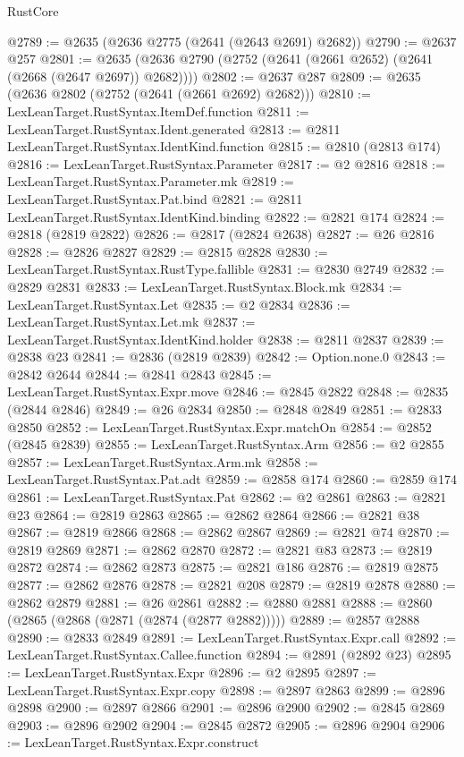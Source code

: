\begin{lexlean}{RustCore}
\begin{coremodule}
@2789 := @2635 (@2636 @2775 (@2641 (@2643 @2691) @2682))
@2790 := @2637 @257
@2801 := @2635 (@2636 @2790 (@2752 (@2641 (@2661 @2652) (@2641 (@2668 (@2647 @2697)) @2682))))
@2802 := @2637 @287
@2809 := @2635 (@2636 @2802 (@2752 (@2641 (@2661 @2692) @2682)))
@2810 := LexLeanTarget.RustSyntax.ItemDef.function
@2811 := LexLeanTarget.RustSyntax.Ident.generated
@2813 := @2811 LexLeanTarget.RustSyntax.IdentKind.function
@2815 := @2810 (@2813 @174)
@2816 := LexLeanTarget.RustSyntax.Parameter
@2817 := @2 @2816
@2818 := LexLeanTarget.RustSyntax.Parameter.mk
@2819 := LexLeanTarget.RustSyntax.Pat.bind
@2821 := @2811 LexLeanTarget.RustSyntax.IdentKind.binding
@2822 := @2821 @174
@2824 := @2818 (@2819 @2822)
@2826 := @2817 (@2824 @2638)
@2827 := @26 @2816
@2828 := @2826 @2827
@2829 := @2815 @2828
@2830 := LexLeanTarget.RustSyntax.RustType.fallible
@2831 := @2830 @2749
@2832 := @2829 @2831
@2833 := LexLeanTarget.RustSyntax.Block.mk
@2834 := LexLeanTarget.RustSyntax.Let
@2835 := @2 @2834
@2836 := LexLeanTarget.RustSyntax.Let.mk
@2837 := LexLeanTarget.RustSyntax.IdentKind.holder
@2838 := @2811 @2837
@2839 := @2838 @23
@2841 := @2836 (@2819 @2839)
@2842 := Option.none.{0}
@2843 := @2842 @2644
@2844 := @2841 @2843
@2845 := LexLeanTarget.RustSyntax.Expr.move
@2846 := @2845 @2822
@2848 := @2835 (@2844 @2846)
@2849 := @26 @2834
@2850 := @2848 @2849
@2851 := @2833 @2850
@2852 := LexLeanTarget.RustSyntax.Expr.matchOn
@2854 := @2852 (@2845 @2839)
@2855 := LexLeanTarget.RustSyntax.Arm
@2856 := @2 @2855
@2857 := LexLeanTarget.RustSyntax.Arm.mk
@2858 := LexLeanTarget.RustSyntax.Pat.adt
@2859 := @2858 @174
@2860 := @2859 @174
@2861 := LexLeanTarget.RustSyntax.Pat
@2862 := @2 @2861
@2863 := @2821 @23
@2864 := @2819 @2863
@2865 := @2862 @2864
@2866 := @2821 @38
@2867 := @2819 @2866
@2868 := @2862 @2867
@2869 := @2821 @74
@2870 := @2819 @2869
@2871 := @2862 @2870
@2872 := @2821 @83
@2873 := @2819 @2872
@2874 := @2862 @2873
@2875 := @2821 @186
@2876 := @2819 @2875
@2877 := @2862 @2876
@2878 := @2821 @208
@2879 := @2819 @2878
@2880 := @2862 @2879
@2881 := @26 @2861
@2882 := @2880 @2881
@2888 := @2860 (@2865 (@2868 (@2871 (@2874 (@2877 @2882)))))
@2889 := @2857 @2888
@2890 := @2833 @2849
@2891 := LexLeanTarget.RustSyntax.Expr.call
@2892 := LexLeanTarget.RustSyntax.Callee.function
@2894 := @2891 (@2892 @23)
@2895 := LexLeanTarget.RustSyntax.Expr
@2896 := @2 @2895
@2897 := LexLeanTarget.RustSyntax.Expr.copy
@2898 := @2897 @2863
@2899 := @2896 @2898
@2900 := @2897 @2866
@2901 := @2896 @2900
@2902 := @2845 @2869
@2903 := @2896 @2902
@2904 := @2845 @2872
@2905 := @2896 @2904
@2906 := LexLeanTarget.RustSyntax.Expr.construct

\end{coremodule}
\end{lexlean}
